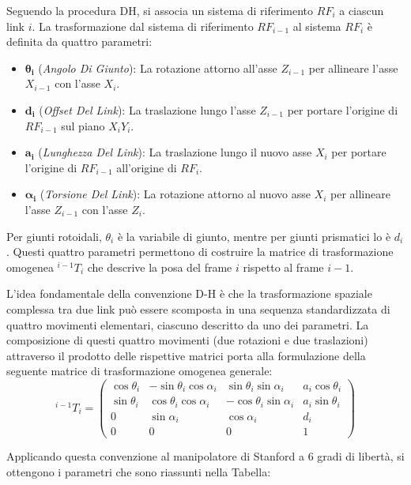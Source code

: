 \documentclass[11pt, a4paper]{report}
\begin{document}
Seguendo la procedura DH, si associa un sistema di riferimento \(RF_i\) a ciascun link \(i\). La trasformazione dal sistema di riferimento \(RF_{i-1}\) al sistema \(RF_i\) è definita da quattro parametri:
\begin{itemize}
    \item \(\bm{\theta_i}\) (\textit{Angolo Di Giunto}): La rotazione attorno all'asse \(Z_{i-1}\) per allineare l'asse \(X_{i-1}\) con l'asse \(X_i\).
    \item \(\bm{d_i}\) (\textit{Offset Del Link}): La traslazione lungo l'asse \(Z_{i-1}\) per portare l'origine di \(RF_{i-1}\) sul piano \(X_{i}Y_{i}\).
    \item \(\bm{a_i}\) (\textit{Lunghezza Del Link}): La traslazione lungo il nuovo asse \(X_i\) per portare l'origine di \(RF_{i-1}\) all'origine di \(RF_i\).
    \item \(\bm{\alpha_i}\) (\textit{Torsione Del Link}): La rotazione attorno al nuovo asse \(X_i\) per allineare l'asse \(Z_{i-1}\) con l'asse \(Z_i\).
\end{itemize}
Per giunti rotoidali, \(\theta_i\) è la variabile di giunto, mentre per giunti prismatici lo è \(d_i\). Questi quattro parametri permettono di costruire la matrice di trasformazione omogenea \(^{i-1}T_i\) che descrive la posa del frame \(i\) rispetto al frame \(i-1\).

L'idea fondamentale della convenzione D-H è che la trasformazione spaziale complessa tra due link può essere scomposta in una sequenza standardizzata di quattro movimenti elementari, ciascuno descritto da uno dei parametri. La composizione di questi quattro movimenti (due rotazioni e due traslazioni) attraverso il prodotto delle rispettive matrici porta alla formulazione della seguente matrice di trasformazione omogenea generale:
\[
    ^{i-1}T_i =
    \begin{pmatrix}
        \cos\theta_i & -\sin\theta_i\cos\alpha_i & \sin\theta_i\sin\alpha_i & a_i\cos\theta_i \\
        \sin\theta_i & \cos\theta_i\cos\alpha_i & -\cos\theta_i\sin\alpha_i & a_i\sin\theta_i \\
        0 & \sin\alpha_i & \cos\alpha_i & d_i \\
        0 & 0 & 0 & 1
    \end{pmatrix}
\]

Applicando questa convenzione al manipolatore di Stanford a 6 gradi di libertà, si ottengono i parametri che sono riassunti nella Tabella:
\end{document}
